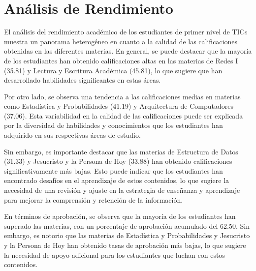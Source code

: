 \vspace{1cm}
\section{Análisis de Rendimiento}
El análisis del rendimiento académico de los estudiantes de primer nivel de TICs muestra un panorama heterogéneo en cuanto a la calidad de las calificaciones obtenidas en las diferentes materias. En general, se puede destacar que la mayoría de los estudiantes han obtenido calificaciones altas en las materias de Redes I (35.81) y Lectura y Escritura Académica (45.81), lo que sugiere que han desarrollado habilidades significantes en estas áreas.

Por otro lado, se observa una tendencia a las calificaciones medias en materias como Estadística y Probabilidades (41.19) y Arquitectura de Computadores (37.06). Esta variabilidad en la calidad de las calificaciones puede ser explicada por la diversidad de habilidades y conocimientos que los estudiantes han adquirido en sus respectivas áreas de estudio.

Sin embargo, es importante destacar que las materias de Estructura de Datos (31.33) y Jesucristo y la Persona de Hoy (33.88) han obtenido calificaciones significativamente más bajas. Esto puede indicar que los estudiantes han encontrado desafíos en el aprendizaje de estos contenidos, lo que sugiere la necesidad de una revisión y ajuste en la estrategia de enseñanza y aprendizaje para mejorar la comprensión y retención de la información.

En términos de aprobación, se observa que la mayoría de los estudiantes han superado las materias, con un porcentaje de aprobación acumulado del 62.50. Sin embargo, es notorio que las materias de Estadística y Probabilidades y Jesucristo y la Persona de Hoy han obtenido tasas de aprobación más bajas, lo que sugiere la necesidad de apoyo adicional para los estudiantes que luchan con estos contenidos.

